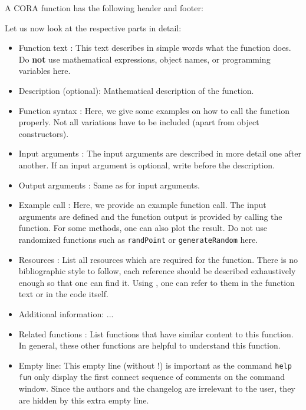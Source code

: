 
A CORA function has the following header and footer: \bigskip

{\small {} }

Let us now look at the respective parts in detail:
\begin{itemize}
	\item Function text :
	This text describes in simple words what the function does.
	Do \textbf{not} use mathematical expressions, object names, or programming variables here.
	\item Description  (optional):
	Mathematical description of the function.
	\item Function syntax :
	Here, we give some examples on how to call the function properly.
	Not all variations have to be included (apart from object constructors).
	\item Input arguments :
	The input arguments are described in more detail one after another.
	If an input argument is optional, write  before the description.
	\item Output arguments :
	Same as for input arguments.
	\item Example call :
	Here, we provide an example function call.
	The input arguments are defined and the function output is provided by calling the function.
	For some methods, one can also plot the result.
	Do not use randomized functions such as \verb|randPoint| or \verb|generateRandom| here.
	\item Resources :
	List all resources which are required for the function.
	There is no bibliographic style to follow, each reference should be described exhaustively enough so that one can find it.
	Using , one can refer to them in the function text or in the code itself.
	\item Additional information: ...
	\item Related functions :
	List functions  that have similar content to this function.
	In general, these other functions are helpful to understand this function.
	\item Empty line: This empty line (without \mcomment{\&}!) is important as the command \verb|help fun| only display the first connect sequence of comments on the command window.
	Since the authors and the changelog are irrelevant to the user, they are hidden by this extra empty line.

\end{itemize}
